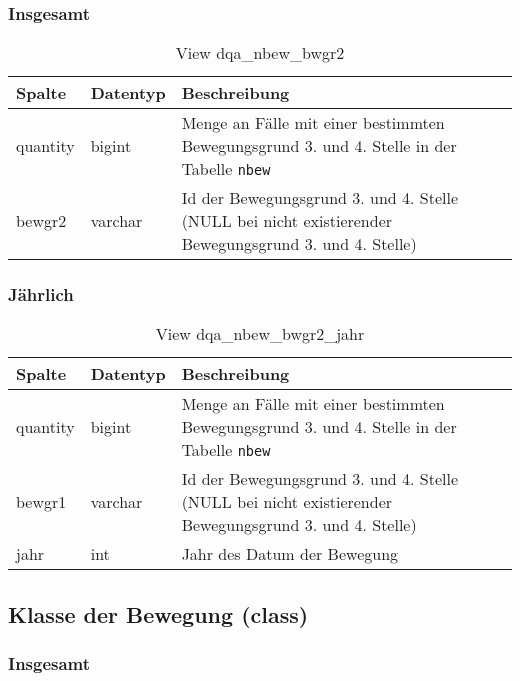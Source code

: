 \subsubsection{Insgesamt} \label{subsubsec:bewg2I}

\begin{table}[ht]
	\centering   
	\caption{View dqa\_nbew\_bwgr2}
	\label{tab:bewG2I}
	\begin{tabular}{||l|l|p{10cm}||}   		
		\hline
		Spalte & Datentyp & Beschreibung \\ [0.5ex]
		\hline\hline
		quantity & bigint & Menge an Fälle mit einer bestimmten Bewegungsgrund 3. und 4. Stelle in der Tabelle \texttt{nbew} \\
		\hline
		bewgr2 & varchar & Id der Bewegungsgrund 3. und 4. Stelle (NULL bei nicht existierender Bewegungsgrund 3. und 4. Stelle)\\
		\hline
		
	\end{tabular}
\end{table}

\subsubsection{Jährlich} \label{subsubsec:bewg2J}

\begin{table}[ht]
	\centering   
	\caption{View dqa\_nbew\_bwgr2\_jahr}
	\label{tab:bewG2J}
	\begin{tabular}{||l|l|p{10cm}||}   		
		\hline
		Spalte & Datentyp & Beschreibung \\ [0.5ex]
		\hline\hline
		quantity & bigint & Menge an Fälle mit einer bestimmten Bewegungsgrund 3. und 4. Stelle in der Tabelle \texttt{nbew}\\
		\hline
		bewgr1 & varchar & Id der Bewegungsgrund 3. und 4. Stelle (NULL bei nicht existierender Bewegungsgrund 3. und 4. Stelle)\\
		\hline
		jahr & int &  Jahr des Datum der Bewegung \\
		\hline		
	\end{tabular}
\end{table}

\subsection{Klasse der Bewegung (class)} \label{subsec:bewclass}

\subsubsection{Insgesamt} \label{subsubsec:bewClassI}

